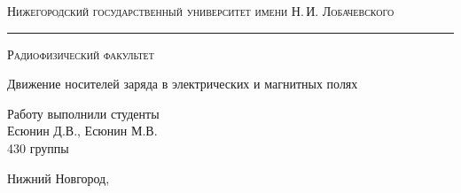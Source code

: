 \documentclass[a4paper,14pt]{extarticle}
\def\labauthors{Есюнин Д.В., Есюнин М.В.}
\def\labnumber{1}
\def\labtheme{Движение носителей заряда в электрических и магнитных полях}
\renewcommand{\phi}{\varphi}
\begin{document}
	\begin{titlepage}
		\begin{center}
			
			
			\textsc{Нижегородский государственный университет имени Н.\,И. Лобачевского}
			\vskip 4pt \hrule \vskip 8pt
			\textsc{Радиофизический факультет}
			
			\vfill
			
			{\Large\labtheme}
			
		\end{center}
		
		\vfill
		
		\begin{flushright}
			{Работу выполнили студенты\\ \labauthors\\ 430 группы}
		\end{flushright}
		
		\vfill
		
		\begin{center}
			Нижний Новгород, \the\year
		\end{center}
	\end{titlepage}
	\tableofcontents
	\newpage 
%
%
\end{document}
